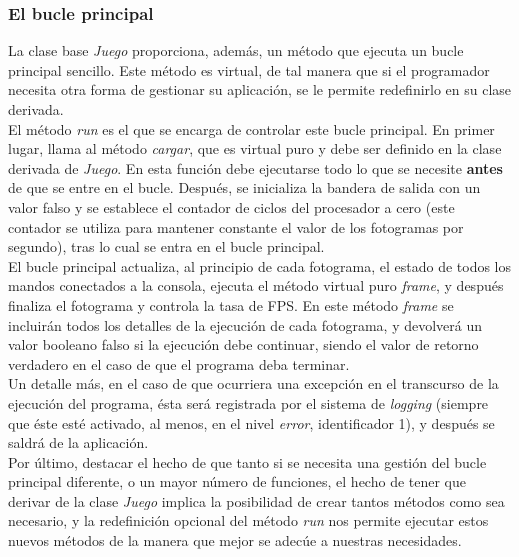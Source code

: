 \subsubsection{El bucle principal}

La clase base \emph{Juego} proporciona, además, un método que ejecuta un bucle principal sencillo. Este método es virtual, de tal manera que si el programador necesita otra forma de gestionar su aplicación, se le permite redefinirlo en su clase derivada.\\

El método \emph{run} es el que se encarga de controlar este bucle principal. En primer lugar, llama al método \emph{cargar}, que es virtual puro y debe ser definido en la clase derivada de \emph{Juego}. En esta función debe ejecutarse todo lo que se necesite \textbf{antes} de que se entre en el bucle. Después, se inicializa la bandera de salida con un valor falso y se establece el contador de ciclos del procesador a cero (este contador se utiliza para mantener constante el valor de los fotogramas por segundo), tras lo cual se entra en el bucle principal.\\

El bucle principal actualiza, al principio de cada fotograma, el estado de todos los mandos conectados a la consola, ejecuta el método virtual puro \emph{frame}, y después finaliza el fotograma y controla la tasa de FPS. En este método \emph{frame} se incluirán todos los detalles de la ejecución de cada fotograma, y devolverá un valor booleano falso si la ejecución debe continuar, siendo el valor de retorno verdadero en el caso de que el programa deba terminar.\\

Un detalle más, en el caso de que ocurriera una excepción en el transcurso de la ejecución del programa, ésta será registrada por el sistema de \emph{logging} (siempre que éste esté activado, al menos, en el nivel \emph{error}, identificador 1), y después se saldrá de la aplicación.\\

Por último, destacar el hecho de que tanto si se necesita una gestión del bucle principal diferente, o un mayor número de funciones, el hecho de tener que derivar de la clase \emph{Juego} implica la posibilidad de crear tantos métodos como sea necesario, y la redefinición opcional del método \emph{run} nos permite ejecutar estos nuevos métodos de la manera que mejor se adecúe a nuestras necesidades.

